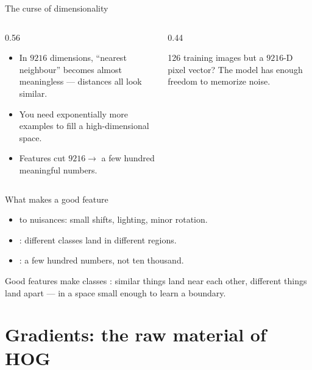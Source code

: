 \documentclass[10pt,aspectratio=169]{beamer}
\begin{document}
\begin{frame}{The curse of dimensionality}
  \begin{columns}[T]
    \begin{column}{0.56\textwidth}
      \begin{itemize}
        \item In $9216$ dimensions, ``nearest neighbour'' becomes almost meaningless — distances all look similar.
        \item You need exponentially more examples to fill a high-dimensional space.
        \item Features cut $9216 \rightarrow$ a few hundred meaningful numbers.
      \end{itemize}
    \end{column}
    \begin{column}{0.44\textwidth}
      \begin{badbox}
        126 training images but a $9216$-D pixel vector? The model has enough freedom to memorize noise.
      \end{badbox}
    \end{column}
  \end{columns}
\end{frame}

\begin{frame}{What makes a good feature}
  \begin{itemize}
    \item {} to nuisances: small shifts, lighting, minor rotation.
    \item {}: different classes land in different regions.
    \item {}: a few hundred numbers, not ten thousand.
  \end{itemize}
  \begin{mathbox}
    Good features make classes : similar things land near each other, different things land apart —
    in a space small enough to learn a boundary.
  \end{mathbox}
\end{frame}

\section{Gradients: the raw material of HOG}
\end{document}
